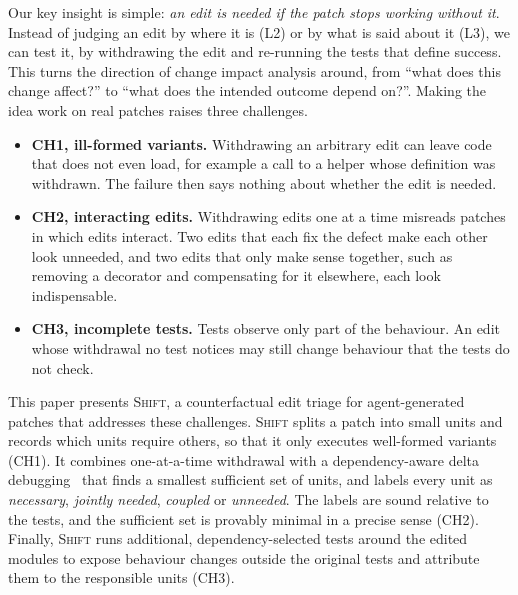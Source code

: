 \documentclass[a4paper,fleqn]{cas-sc}
\newcommand{\tool}{\textsc{Shift}}
\begin{document}
Our key insight is simple: \emph{an edit is needed if the patch stops working without it}. Instead of judging an edit by where it is (L2) or by what is said about it (L3), we can test it, by withdrawing the edit and re-running the tests that define success. This turns the direction of change impact analysis around, from ``what does this change affect?'' to ``what does the intended outcome depend on?''. Making the idea work on real patches raises three challenges.
\begin{itemize}
\item \textbf{CH1, ill-formed variants.} Withdrawing an arbitrary edit can leave code that does not even load, for example a call to a helper whose definition was withdrawn. The failure then says nothing about whether the edit is needed.
\item \textbf{CH2, interacting edits.} Withdrawing edits one at a time misreads patches in which edits interact. Two edits that each fix the defect make each other look unneeded, and two edits that only make sense together, such as removing a decorator and compensating for it elsewhere, each look indispensable.
\item \textbf{CH3, incomplete tests.} Tests observe only part of the behaviour. An edit whose withdrawal no test notices may still change behaviour that the tests do not check.
\end{itemize}

This paper presents \tool{}, a counterfactual edit triage for agent-generated patches that addresses these challenges. \tool{} splits a patch into small units and records which units require others, so that it only executes well-formed variants (CH1). It combines one-at-a-time withdrawal with a dependency-aware delta debugging~\citep{zeller2002ddmin} that finds a smallest sufficient set of units, and labels every unit as \emph{necessary}, \emph{jointly needed}, \emph{coupled} or \emph{unneeded}. The labels are sound relative to the tests, and the sufficient set is provably minimal in a precise sense (CH2). Finally, \tool{} runs additional, dependency-selected tests around the edited modules to expose behaviour changes outside the original tests and attribute them to the responsible units (CH3).
\end{document}
